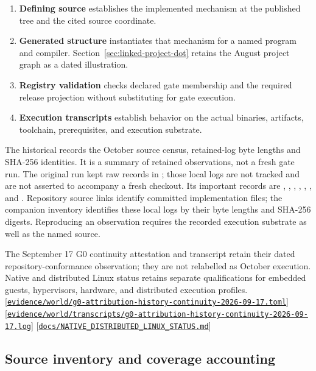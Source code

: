 \documentclass[11pt,oneside]{article}
\newcommand{\src}[1]{\textcolor{OSlate}{\scriptsize[\href{https://github.com/lostadi/OSTADIX/blob/c0b02c326b2329a95ba52447c7180bc93957cd57/#1}{\nolinkurl{#1}}]}\allowbreak}
\begin{document}
\begin{enumerate}
  \item \textbf{Defining source} establishes the implemented mechanism at the
        published tree and the cited source coordinate.
  \item \textbf{Generated structure} instantiates that mechanism for a named
        program and compiler. Section~\ref{sec:linked-project-dot} retains the
        August project graph as a dated illustration.
  \item \textbf{Registry validation} checks declared gate membership and the
        required release projection without substituting for gate execution.
  \item \textbf{Execution transcripts} establish behavior on the actual
        binaries, artifacts, toolchain, prerequisites, and execution substrate.
\end{enumerate}

The historical  records
the October source census, retained-log byte lengths and SHA-256 identities.
It is a summary of retained observations, not a fresh gate run. The original
run kept raw records in ; those local logs are
not tracked and are not asserted to accompany a fresh checkout. Its important records are
,
,
,
,
,
, and
. Repository source links identify committed
implementation files; the companion inventory identifies these local logs
by their byte lengths and SHA-256 digests. Reproducing an observation requires
the recorded execution substrate as well as the named source.

The September 17 G0 continuity attestation and transcript retain their dated
repository-conformance observation; they are not relabelled as October
execution. Native and distributed Linux status retains separate
qualifications for embedded guests, hypervisors, hardware, and distributed
execution profiles.
\src{evidence/world/g0-attribution-history-continuity-2026-09-17.toml}
\src{evidence/world/transcripts/g0-attribution-history-continuity-2026-09-17.log}
\src{docs/NATIVE_DISTRIBUTED_LINUX_STATUS.md}

\subsection{Source inventory and coverage accounting}
\end{document}
